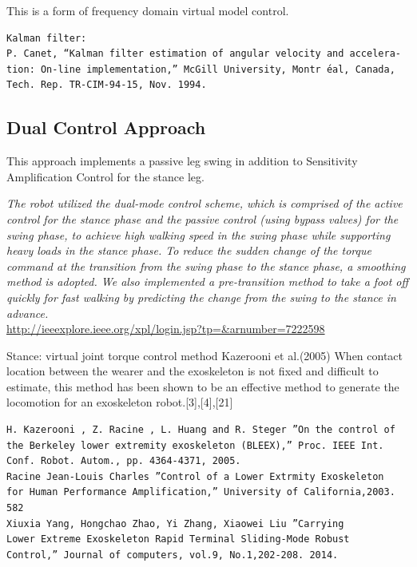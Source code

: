 \documentclass[letterpaper,12pt,fullpage]{article}
\begin{document}
This is a form of frequency domain virtual model control.

\begin{verbatim}
Kalman filter:
P. Canet, “Kalman filter estimation of angular velocity and accelera-
tion: On-line implementation,” McGill University, Montr ́eal, Canada,
Tech. Rep. TR-CIM-94-15, Nov. 1994.
\end{verbatim}

\subsection{Dual Control Approach}

This approach implements a passive leg swing in addition to Sensitivity 
Amplification Control for the stance leg.

{\it The robot utilized the dual-mode control scheme, which is
comprised of the active control for the stance phase and the
passive control (using bypass valves) for the swing phase, to achieve high walking
speed in the swing phase while supporting heavy loads in
the stance phase. To reduce the sudden change of the torque
command at the transition from the swing phase to the stance
phase, a smoothing method is adopted. We also implemented
a pre-transition method to take a foot off quickly for fast
walking by predicting the change from the swing to the stance
in advance.}\\
\url{http://ieeexplore.ieee.org/xpl/login.jsp?tp=&arnumber=7222598}


Stance: virtual joint torque control method Kazerooni et al.(2005)
When contact location between the wearer and the
exoskeleton is not fixed and difficult to estimate, this method
has been shown to be an effective method to generate the
locomotion for an exoskeleton robot.[3],[4],[21]
\begin{verbatim}
H. Kazerooni , Z. Racine , L. Huang and R. Steger ”On the control of
the Berkeley lower extremity exoskeleton (BLEEX),” Proc. IEEE Int.
Conf. Robot. Autom., pp. 4364-4371, 2005.
Racine Jean-Louis Charles ”Control of a Lower Extrmity Exoskeleton
for Human Performance Amplification,” University of California,2003.
582
Xiuxia Yang, Hongchao Zhao, Yi Zhang, Xiaowei Liu ”Carrying
Lower Extreme Exoskeleton Rapid Terminal Sliding-Mode Robust
Control,” Journal of computers, vol.9, No.1,202-208. 2014.
\end{verbatim}
\end{document}
